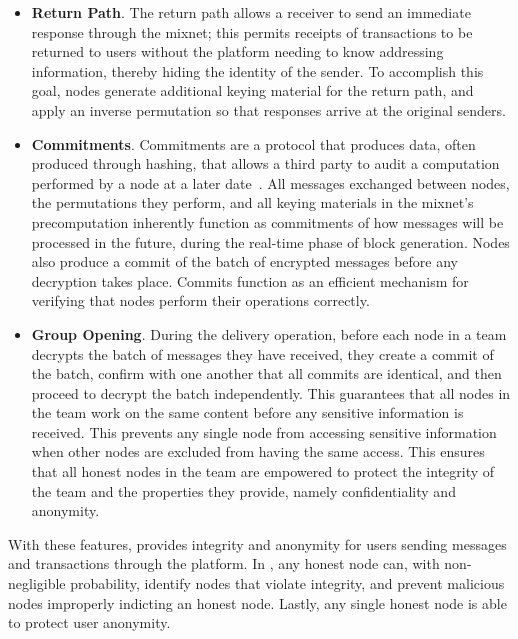 \begin{itemize}
    \item \textbf{Return Path}. The return path allows a receiver to send an immediate response through the mixnet; this permits receipts of transactions to be returned to users without the platform needing to know addressing information, thereby hiding the identity of the sender. To accomplish this goal, nodes generate additional keying material for the return path, and apply an inverse permutation so that responses arrive at the original senders.
    \item \textbf{Commitments}. Commitments are a protocol that produces data, often produced through hashing, that allows a third party to audit a computation performed by a node at a later date~\cite{commit}. All messages exchanged between nodes, the permutations they perform, and all keying materials in the mixnet's precomputation inherently function as commitments of how messages will be processed in the future, during the real-time phase of block generation. Nodes also produce a commit of the batch of encrypted messages before any decryption takes place. Commits function as an efficient mechanism for verifying that nodes perform their operations correctly.
    \item \textbf{Group Opening}. During the delivery operation, before each node in a team decrypts the batch of messages they have received, they create a commit of the batch, confirm with one another that all commits are identical, and then proceed to decrypt the batch independently. This guarantees that all nodes in the team work on the same content before any sensitive information is received. This prevents any single node from accessing sensitive information when other nodes are excluded from having the same access. This ensures that all honest nodes in the team are empowered to protect the integrity of the team and the properties they provide, namely confidentiality and anonymity.
\end{itemize}

With these features, \name provides integrity and anonymity for users sending messages and transactions through the platform. In \name, any honest node can, with non-negligible probability, identify nodes that violate integrity, and prevent malicious nodes improperly indicting an honest node. Lastly, any single honest node is able to protect user anonymity.